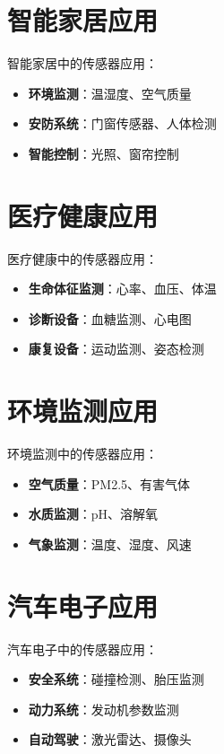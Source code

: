 \documentclass[12pt,UTF8]{ctexbook}
\begin{document}
\section{智能家居应用}

智能家居中的传感器应用：

\begin{itemize}[leftmargin=2cm]
	\item \textbf{环境监测}：温湿度、空气质量
	\item \textbf{安防系统}：门窗传感器、人体检测
	\item \textbf{智能控制}：光照、窗帘控制
\end{itemize}

\section{医疗健康应用}

医疗健康中的传感器应用：

\begin{itemize}[leftmargin=2cm]
	\item \textbf{生命体征监测}：心率、血压、体温
	\item \textbf{诊断设备}：血糖监测、心电图
	\item \textbf{康复设备}：运动监测、姿态检测
\end{itemize}

\section{环境监测应用}

环境监测中的传感器应用：

\begin{itemize}[leftmargin=2cm]
	\item \textbf{空气质量}：PM2.5、有害气体
	\item \textbf{水质监测}：pH、溶解氧
	\item \textbf{气象监测}：温度、湿度、风速
\end{itemize}

\section{汽车电子应用}

汽车电子中的传感器应用：

\begin{itemize}[leftmargin=2cm]
	\item \textbf{安全系统}：碰撞检测、胎压监测
	\item \textbf{动力系统}：发动机参数监测
	\item \textbf{自动驾驶}：激光雷达、摄像头
\end{itemize}
\end{document}
